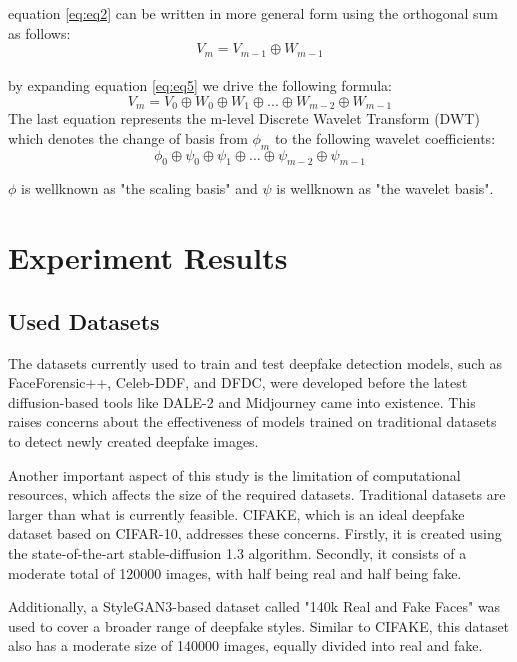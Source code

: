 \documentclass{svproc}
\begin{document}
\noindent
equation \ref{eq:eq2} can be written in more general form using the orthogonal sum as follows:\\
\begin{equation}
  V_m=V_{m-1} \oplus W_{m-1}
  \label{eq:eq5}
\end{equation}\\
\noindent
by expanding equation \ref{eq:eq5} we drive the following formula:
\begin{equation}
  V_m=V_0\oplus W_0\oplus W_1\oplus ... \oplus W_{m-2}\oplus W_{m-1}
  \label{eq:eq6}
\end{equation}
\noindent
The last equation represents the m-level Discrete Wavelet Transform (DWT)
which denotes the change of basis from $\phi_m$ to the following wavelet coefficients:
\begin{equation}
  \phi_0\oplus \psi_0\oplus \psi_1\oplus ... \oplus \psi_{m-2}\oplus \psi_{m-1}
  \label{eq:eq7}
\end{equation}

\noindent
$\phi$ is wellknown as "the scaling basis" and $\psi$ is wellknown as "the wavelet basis".\\



\section{Experiment Results}
\subsection{Used Datasets}
The datasets currently used to train and test deepfake detection models,
such as FaceForensic++, Celeb-DDF, and DFDC, were developed before the latest
diffusion-based tools like DALE-2 and Midjourney came into existence. This
raises concerns about the effectiveness of models trained on traditional
datasets to detect newly created deepfake images.

Another important aspect of this study is the limitation of computational
resources, which affects the size of the required datasets. Traditional
datasets are larger than what is currently feasible. CIFAKE, which is an ideal
deepfake dataset based on CIFAR-10, addresses these concerns. Firstly, it is
created using the state-of-the-art stable-diffusion 1.3 algorithm. Secondly, it
consists of a moderate total of 120000 images, with half being real and half
being fake.

Additionally, a StyleGAN3-based dataset called "140k Real and Fake Faces" was
used to cover a broader range of deepfake styles. Similar to CIFAKE, this
dataset also has a moderate size of 140000 images, equally divided into real
and fake.
\end{document}

